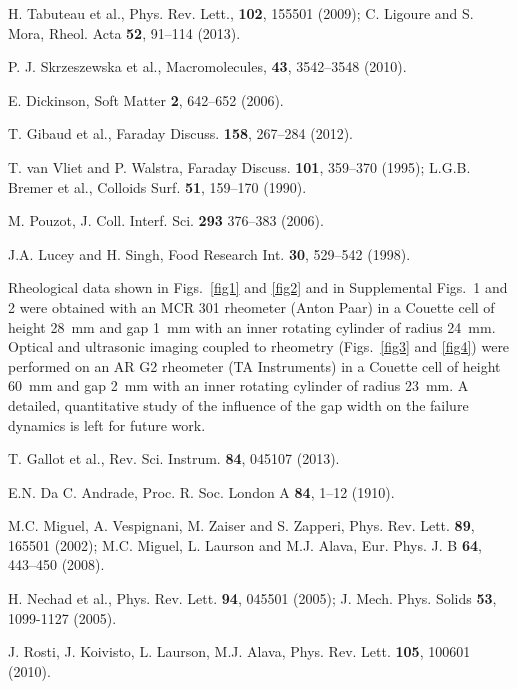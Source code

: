 \documentclass[twocolumn,superscriptaddress,showpacs,preprintnumbers,amsmath,amssymb,prl]{revtex4}
\begin{document}
\begin{thebibliography}{}
 H. Tabuteau et al., Phys. Rev. Lett., {\bf 102}, 155501 (2009); C. Ligoure and S. Mora, Rheol. Acta {\bf 52}, 91--114 (2013).

 P. J. Skrzeszewska et al., Macromolecules, {\bf 43}, 3542--3548 (2010).

 E. Dickinson, Soft Matter {\bf 2}, 642--652 (2006).

 T. Gibaud et al., Faraday Discuss. {\bf 158}, 267--284 (2012).


 T. van Vliet and P. Walstra, Faraday Discuss. {\bf 101}, 359--370 (1995); L.G.B. Bremer et al., Colloids Surf. {\bf 51}, 159--170 (1990).

 M. Pouzot, J. Coll. Interf. Sci. {\bf 293} 376--383 (2006).

 J.A. Lucey and H. Singh, Food Research Int. {\bf 30}, 529--542 (1998).

 Rheological data shown in Figs.~\ref{fig1} and \ref{fig2} and in Supplemental Figs.~1 and 2 were obtained with an MCR 301 rheometer (Anton Paar) in a Couette cell of height 28~mm and gap 1~mm with an inner rotating cylinder of radius 24~mm. Optical and ultrasonic imaging coupled to rheometry (Figs.~\ref{fig3} and \ref{fig4}) were performed on an AR G2 rheometer (TA Instruments) in a Couette cell of height 60~mm and gap 2~mm with an inner rotating cylinder of radius 23~mm. A detailed, quantitative study of the influence of the gap width on the failure dynamics is left for future work.

 T. Gallot et al., Rev. Sci. Instrum. {\bf 84}, 045107 (2013).

 E.N. Da C. Andrade, Proc. R. Soc. London A {\bf 84}, 1--12 (1910).

 M.C. Miguel, A. Vespignani, M. Zaiser and S. Zapperi, Phys. Rev. Lett. {\bf 89}, 165501 (2002); M.C. Miguel, L. Laurson and M.J. Alava, Eur. Phys. J. B {\bf 64}, 443--450 (2008).

 H. Nechad et al., Phys. Rev. Lett. {\bf 94}, 045501 (2005); J. Mech. Phys. Solids {\bf 53}, 1099-1127 (2005).

 J. Rosti, J. Koivisto, L. Laurson, M.J. Alava, Phys. Rev. Lett. {\bf 105}, 100601 (2010).


\end{thebibliography}
\end{document}
